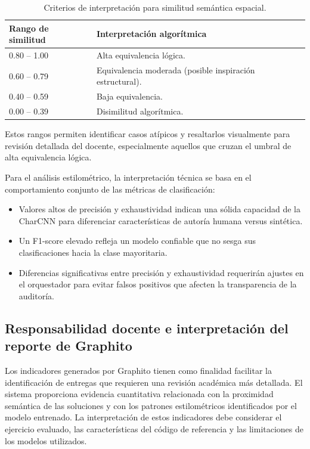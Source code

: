 \begin{table}[H]
	\centering
	\begin{tabular}{ll}
		\toprule
		\textbf{Rango de similitud} & \textbf{Interpretación algorítmica}                      \\
		\midrule
		0.80 -- 1.00                & Alta equivalencia lógica.                                \\
		0.60 -- 0.79                & Equivalencia moderada (posible inspiración estructural). \\
		0.40 -- 0.59                & Baja equivalencia.                                       \\
		0.00 -- 0.39                & Disimilitud algorítmica.                                 \\
		\bottomrule
	\end{tabular}
	\caption{Criterios de interpretación para similitud semántica espacial.}
	\label{tab:criterios_similitud}
\end{table}

Estos rangos permiten identificar casos atípicos y resaltarlos visualmente para revisión detallada del docente, especialmente aquellos que cruzan el umbral de alta equivalencia lógica.

Para el análisis estilométrico, la interpretación técnica se basa en el comportamiento conjunto de las métricas de clasificación:

\begin{itemize}
	\item Valores altos de precisión y exhaustividad indican una sólida capacidad de la CharCNN para diferenciar características de autoría humana versus sintética.
	\item Un F1-score elevado refleja un modelo confiable que no sesga sus clasificaciones hacia la clase mayoritaria.
	\item Diferencias significativas entre precisión y exhaustividad requerirán ajustes en el orquestador para evitar falsos positivos que afecten la transparencia de la auditoría.
\end{itemize}

\subsection{Responsabilidad docente e interpretación del reporte de Graphito}

Los indicadores generados por Graphito tienen como finalidad facilitar la identificación de entregas que requieren una revisión académica más detallada. El sistema proporciona evidencia cuantitativa relacionada con la proximidad semántica de las soluciones y con los patrones estilométricos identificados por el modelo entrenado. La interpretación de estos indicadores debe considerar el ejercicio evaluado, las características del código de referencia y las limitaciones de los modelos utilizados.

